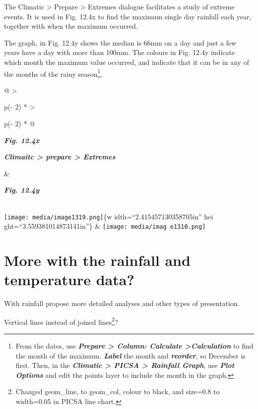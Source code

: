 \documentclass[
  letterpaper,
  DIV=11,
  numbers=noendperiod]{scrreprt}
\begin{document}
The Climatic \textgreater{} Prepare \textgreater{} Extremes dialogue
facilitates a study of extreme events. It is used in Fig. 12.4x to find
the maximum single day rainfall each year, together with when the
maximum occurred.

The graph, in Fig. 12.4y shows the median is 66mm on a day and just a
few years have a day with more than 100mm. The colours in Fig. 12.4y
indicate which month the maximum value occurred, and indicate that it
can be in any of the months of the rainy season\footnote{From the dates,
  use \textbf{\emph{Prepare \textgreater{} Column: Calculate
  \textgreater Calculation}} to find the month of the maximum.
  \textbf{\emph{Label}} the month and \textbf{\emph{reorder}}, so
  December is first. Then, in the \textbf{\emph{Climatic \textgreater{}
  PICSA \textgreater{} Rainfall Graph}}, use \textbf{\emph{Plot
  Options}} and edit the points layer to include the month in the graph.}.

\begin{longtable}[]{@{}
  >{\raggedright\arraybackslash}p{(\columnwidth - 2\tabcolsep) * }
  >{\raggedright\arraybackslash}p{(\columnwidth - 2\tabcolsep) * }@{}}
\toprule\noalign{}
\begin{minipage}[b]{\linewidth}\raggedright
\textbf{\emph{Fig. 12.4x}}

\textbf{\emph{Climaitc \textgreater{} prepare \textgreater{} Extremes}}
\end{minipage} & \begin{minipage}[b]{\linewidth}\raggedright
\textbf{\emph{Fig. 12.4y}}
\end{minipage} \\
\midrule\noalign{}
\endhead
\bottomrule\noalign{}
\endlastfoot
\texttt{[image: media/image1319.png]}\{w idth=``2.415457130358705in''
hei ght=``3.559381014873141in''\} &
\texttt{[image: media/imag e1310.png]} \\
\end{longtable}

\section{More with the rainfall and temperature
data?}\label{more-with-the-rainfall-and-temperature-data}

With rainfall propose more detailed analyses and other types of
presentation.

Vertical lines instead of joined lines\footnote{Changed geom\_line, to
  geom\_col, colour to black, and size=0.8 to width=0.05 in PICSA line
  chart.}?
\end{document}
